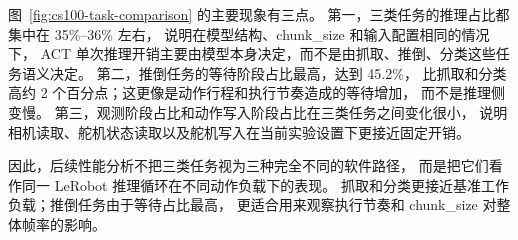 图~\ref{fig:cs100-task-comparison} 的主要现象有三点。
第一，三类任务的推理占比都集中在 35\%--36\% 左右，
说明在模型结构、chunk\_size 和输入配置相同的情况下，
ACT 单次推理开销主要由模型本身决定，而不是由抓取、推倒、分类这些任务语义决定。
第二，推倒任务的等待阶段占比最高，达到 45.2\%，
比抓取和分类高约 2 个百分点；这更像是动作行程和执行节奏造成的等待增加，
而不是推理侧变慢。
第三，观测阶段占比和动作写入阶段占比在三类任务之间变化很小，
说明相机读取、舵机状态读取以及舵机写入在当前实验设置下更接近固定开销。

因此，后续性能分析不把三类任务视为三种完全不同的软件路径，
而是把它们看作同一 LeRobot 推理循环在不同动作负载下的表现。
抓取和分类更接近基准工作负载；推倒任务由于等待占比最高，
更适合用来观察执行节奏和 chunk\_size 对整体帧率的影响。
